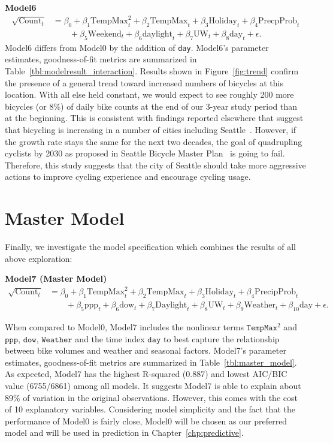 \documentclass [11pt, proquest] {uwthesis}[2015/03/03]
\begin{document}
\textbf{Model6}
\begin{align}
\sqrt{\text{Count}_t} &= \beta_0 + \beta_1 \text{TempMax}^2_t + \beta_2 \text{TempMax}_t + \beta_3 \text{Holiday}_t + \beta_4 \text{PrecpProb}_t \nonumber\\
&\qquad +\beta_5 \text{Weekend}_t  + \beta_6 \text{daylight}_t + \beta_7 \text{UW}_t + \beta_8\text{day}_t + \epsilon. \label{eqref:model6}
\end{align}
Model6 differs from Model0 by the addition of \texttt{day}. Model6's parameter estimates, goodness-of-fit metrics are summarized in Table~\ref{tbl:modelresult_interaction}. Results shown in Figure~\ref{fig:trend} confirm the presence of a general trend toward increased numbers of bicycles at this location. With all else held constant, we would expect to see roughly 200 more bicycles (or 8\%) of daily bike counts at the end of our 3-year study period than at the beginning. This is consistent with findings reported elsewhere that suggest that bicycling is increasing in a number of cities including Seattle~\cite{League-of-American-Bicyclists:aa}. However, if the growth rate stays the same for the next two decades, the goal of quadrupling cyclists by 2030 as proposed in Seattle Bicycle Master Plan~\cite{SDOT_BMP15} is going to fail. Therefore, this study suggests that the city of Seattle should take more aggressive actions to improve cycling experience and encourage cycling usage.

\section{Master Model}

Finally, we investigate the model specification which combines the results of all above exploration:

\textbf{Model7 (Master Model)}
\begin{align}
\sqrt{\text{Count}_t} &= \beta_0 + \beta_1 \text{TempMax}^2_t + \beta_2 \text{TempMax}_t + \beta_3 \text{Holiday}_t + \beta_4 \text{PrecipProb}_t  \nonumber\\
&\qquad + \beta_5 \text{ppp}_t + \beta_6 \text{dow}_t + \beta_7 \text{Daylight}_t + \beta_8 \text{UW}_t + \beta_9 \text{Weather}_t + \beta_{10} \text{day} + \epsilon.\label{eqn:model7}
\end{align}

When compared to Model0, Model7 includes the nonlinear terms $\texttt{TempMax}^2$ and $\texttt{ppp}$, $\texttt{dow}$, $\texttt{Weather}$ and the time index $\texttt{day}$ to best capture the relationship between bike volumes and weather and seasonal factors. Model7's parameter estimates, goodness-of-fit metrics are summarized in Table~\ref{tbl:master_model}. As expected, Model7 has the highest R-squared (0.887) and lowest AIC/BIC value (6755/6861) among all models. It suggests Model7 is able to explain about 89\% of variation in the original observations. However, this comes with the cost of 10 explanatory variables. Considering model simplicity and the fact that the performance of Model0 is fairly close, Model0 will be chosen as our preferred model and will be used in prediction in Chapter~\ref{chp:predictive}.  
\end{document}
